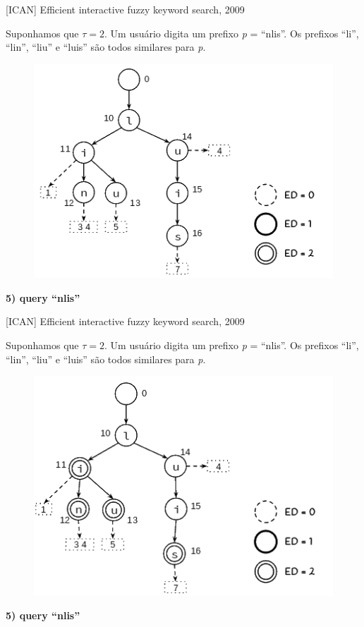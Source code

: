 \documentclass[11pt]{beamer}
\begin{document}
\begin{frame}{[ICAN] Efficient interactive fuzzy keyword search, 2009}

    \small
    Suponhamos que $\tau = 2$. Um usuário digita um prefixo \textit{p} = ``nlis''. Os prefixos ``li'', ``lin'', ``liu'' e ``luis'' são todos similares para \textit{p}.
    
    \begin{figure}
      \includegraphics[scale=0.45]{pictures/ican_default.png}
      \centering
    \end{figure}
    
    \textbf{5) query ``nlis''}
    
\end{frame}

\begin{frame}{[ICAN] Efficient interactive fuzzy keyword search, 2009}

    \small
    Suponhamos que $\tau = 2$. Um usuário digita um prefixo \textit{p} = ``nlis''. Os prefixos ``li'', ``lin'', ``liu'' e ``luis'' são todos similares para \textit{p}.
    
    \begin{figure}
      \includegraphics[scale=0.45]{pictures/ican_6.png}
      \centering
    \end{figure}
    
    \textbf{5) query ``nlis''}
    
\end{frame}
\end{document}
